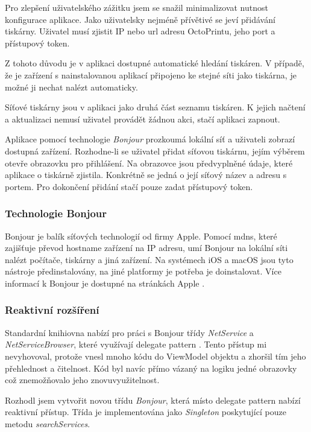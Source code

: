 Pro zlepšení uživatelského zážitku jsem se snažil minimalizovat nutnost konfigurace aplikace.
Jako uživatelsky nejméně přívětivé se jeví přidávání tiskárny.
Uživatel musí zjistit IP nebo \acrshort{url} adresu OctoPrintu, jeho port a přístupový token.

Z tohoto důvodu je v aplikaci dostupné automatické hledání tiskáren.
V případě, že je zařízení s nainstalovanou aplikací připojeno ke stejné síti jako tiskárna, je možné ji nechat nalézt automaticky.

Síťové tiskárny jsou v aplikaci jako druhá část seznamu tiskáren.
K jejich načtení a aktualizaci nemusí uživatel provádět žádnou akci, stačí aplikaci zapnout.

Aplikace pomocí technologie \textit{Bonjour} prozkoumá lokální síť a uživateli zobrazí dostupná zařízení.
Rozhodne-li se uživatel přidat síťovou tiskárnu, jejím výběrem otevře obrazovku pro přihlášení.
Na obrazovce jsou předvyplněné údaje, které aplikace o tiskárně zjistila.
Konkrétně se jedná o její síťový název a adresu s portem.
Pro dokončení přidání stačí pouze zadat přístupový token.

\subsubsection*{Technologie Bonjour}

Bonjour je balík síťových technologií od firmy Apple.
Pomocí \acrfull{mdns}, které zajišťuje převod hostname zařízení na IP adresu, umí Bonjour na lokální síti nalézt počítače, tiskárny a jiná zařízení.
Na systémech iOS a macOS jsou tyto nástroje předinstalovány, na jiné platformy je potřeba je doinstalovat.
Více informací k Bonjour je dostupné na stránkách Apple \cite{apple-bonjour}.

\subsubsection*{Reaktivní rozšíření}

Standardní knihiovna nabízí pro práci s Bonjour třídy \textit{NetService} a \textit{NetServiceBrowser}, které využívají delegate pattern \cite{apple-netservicebrowser}.
Tento přístup mi nevyhovoval, protože vnesl mnoho kódu do ViewModel objektu a zhoršil tím jeho přehlednost a čitelnost.
Kód byl navíc přímo vázaný na logiku jedné obrazovky což znemožňovalo jeho znovuvyužitelnost.

Rozhodl jsem vytvořit novou třídu \textit{Bonjour}, která místo delegate pattern nabízí reaktivní přístup.
Třída je implementována jako \textit{Singleton} \cite{thatthinginswift-singletons} poskytující pouze metodu \textit{searchServices}.

